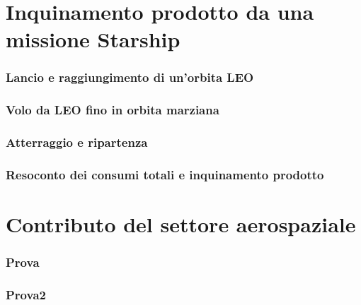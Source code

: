\documentclass[11pt]{article}
\begin{document}
\part{Inquinamento prodotto da una missione Starship}
\setcounter{section}{0}
\section{Lancio e raggiungimento di un'orbita LEO}

\section{Volo da LEO fino in orbita marziana}

\section{Atterraggio e ripartenza}

\section{Resoconto dei consumi totali e inquinamento prodotto}

\newpage
\part{Contributo del settore aerospaziale}
\setcounter{section}{0}
\section{Prova}
\section{Prova2}
\printbibliography
\end{document}
